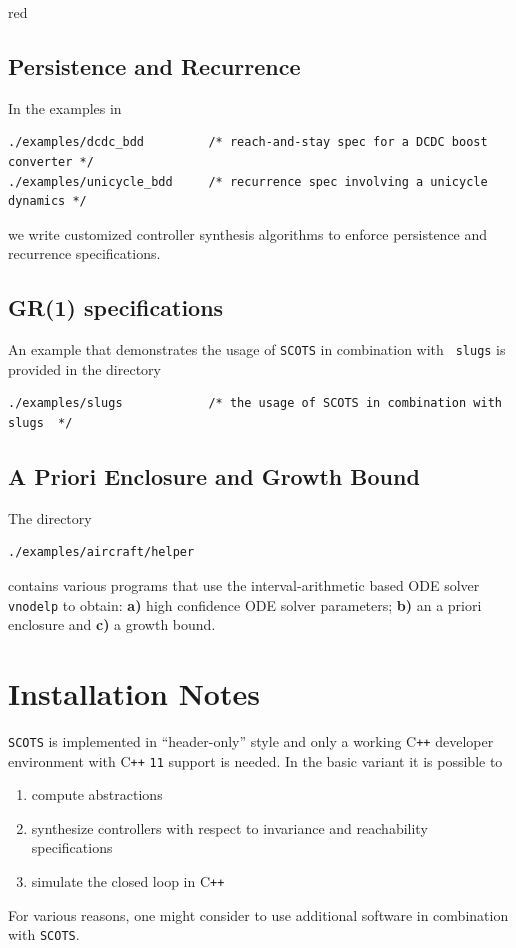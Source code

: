 \documentclass[a4paper]{amsart}
\newcommand\Cpp{C\texttt{++} }
\begin{document}
\begin{color}{red}
\subsection{Persistence and Recurrence} In the examples in
\begin{lstlisting}[basicstyle=\small\ttfamily]
./examples/dcdc_bdd        	/* reach-and-stay spec for a DCDC boost converter */ 
./examples/unicycle_bdd  	/* recurrence spec involving a unicycle dynamics */ 
\end{lstlisting}
we write customized controller synthesis algorithms to enforce persistence and recurrence specifications.

\subsection{GR(1) specifications}
An example that demonstrates the usage of {\tt SCOTS} in combination with {\tt
slugs} is provided in the directory
\begin{lstlisting}[basicstyle=\small\ttfamily]
./examples/slugs        	/* the usage of SCOTS in combination with slugs  */ 
\end{lstlisting}
\end{color}

\subsection{A Priori Enclosure and Growth Bound}
The directory 
\begin{lstlisting}[basicstyle=\small\ttfamily]
./examples/aircraft/helper        	
\end{lstlisting}
contains various programs that 
use the interval-arithmetic based ODE solver {\tt vnodelp} to obtain: {\bf a)} high
confidence ODE solver parameters; {\bf b)} an a priori enclosure and {\bf c)} a growth
bound.


\newpage
\section{Installation Notes}
\label{s:req}

{\tt SCOTS} is implemented in ``header-only'' style and  only a working \Cpp developer environment with \Cpp{\tt11} support
is needed. In the basic variant it is possible to
\begin{enumerate}
  \item compute abstractions
  \item synthesize controllers with respect to invariance and reachability specifications 
  \item simulate the closed loop in \Cpp
\end{enumerate}
For various reasons, one might consider to use additional software in combination with {\tt SCOTS}.
\end{document}

